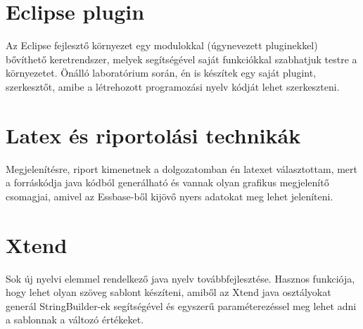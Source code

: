 \section{Eclipse plugin}
Az Eclipse fejlesztő környezet egy modulokkal (úgynevezett pluginekkel) bővíthető keretrendszer, melyek segítségével saját funkciókkal szabhatjuk testre a környezetet. Önálló laboratórium során, én is készítek egy saját plugint, szerkesztőt, amibe a létrehozott programozási nyelv kódját lehet szerkeszteni.

\section{Latex és riportolási technikák}
Megjelenítésre, riport kimenetnek a dolgozatomban én latexet választottam, mert a forráskódja java kódból generálható és vannak olyan grafikus megjelenítő csomagjai, amivel az Essbase-ből kijövő nyers adatokat meg lehet jeleníteni.

\section{Xtend}
Sok új nyelvi elemmel rendelkező java nyelv továbbfejlesztése. Hasznos funkciója, hogy lehet olyan szöveg sablont készíteni, amiből az Xtend java osztályokat generál StringBuilder-ek segítségével és egyszerű paraméterezéssel meg lehet adni a sablonnak a változó értékeket.

